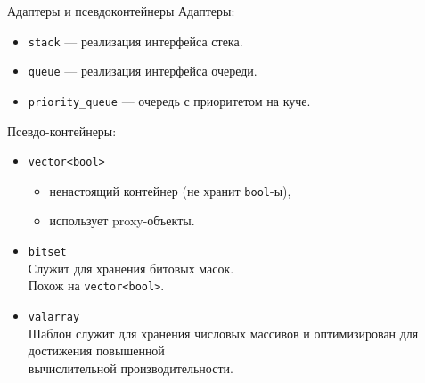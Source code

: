 \documentclass{beamer}
\begin{document}
\begin{frame}{Адаптеры и псевдоконтейнеры}
    Адаптеры:
    \begin{itemize}
        \item {\tt stack} —
            реализация интерфейса стека.

        \item {\tt queue} —
            реализация интерфейса очереди.

        \item {\tt priority\_queue} —
            очередь с приоритетом на куче.
    \end{itemize}
    
    Псевдо-контейнеры:
    \begin{itemize}
        \item {\tt vector<bool>}
        \begin{itemize}
            \item ненастоящий контейнер (не хранит {\tt bool}-ы),
            \item использует proxy-объекты.
        \end{itemize}
        \item {\tt bitset}\\
            Служит для хранения битовых масок.\\ Похож на
            {\tt vector<bool>}.
                        
        \item {\tt valarray}\\
            Шаблон служит для хранения числовых массивов
            и оптимизирован для достижения повышенной\\ вычислительной
            производительности. 
    \end{itemize}
\end{frame}
\end{document}
